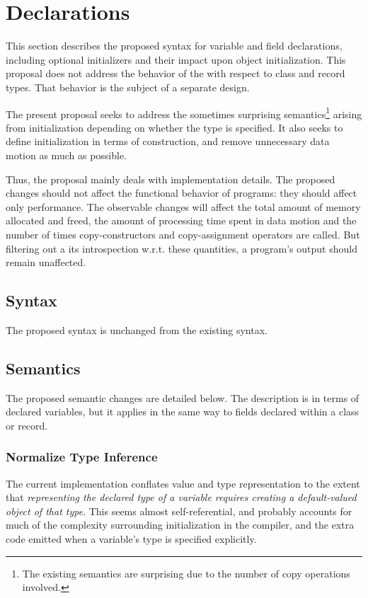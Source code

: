 \section{Declarations}
\label{Declarations}

This section describes the proposed syntax for variable and field declarations, including
optional initializers and their impact upon object initialization.  This proposal does not
address the behavior of the  with respect to class and record
types.  That behavior is the subject of a separate design.

The present proposal seeks to address the sometimes surprising
semantics\footnote{The existing semantics are surprising due to the number of
  copy operations involved.} arising from
initialization depending on whether the type is specified.  It also seeks to define
initialization in terms of construction, and remove unnecessary data motion as much as
possible.

Thus, the proposal mainly deals with implementation details.  The proposed changes should
not affect the functional behavior of programs: they should affect only performance.  The
observable changes will affect the total amount of memory allocated and freed, the amount
of processing time spent in data motion and the number of times copy-constructors and
copy-assignment operators are called.  But filtering out a its introspection
w.r.t. these quantities, a program's output should remain unaffected.

\subsection{Syntax}

The proposed syntax is unchanged from the existing syntax.

\subsection{Semantics}

The proposed semantic changes are detailed below.  The description is in terms of declared
variables, but it applies in the same way to fields declared within a class or record.

\subsubsection{Normalize Type Inference}

The current implementation conflates value and type representation to the extent that
\emph{representing the declared type of a variable requires creating a default-valued
  object of that type}.  This seems almost self-referential, and probably accounts for
much of the complexity surrounding initialization in the compiler, and the extra code
emitted when a variable's type is specified explicitly.

